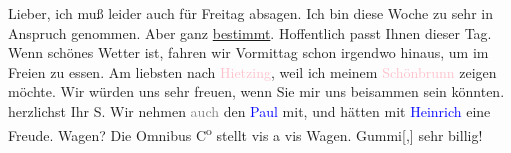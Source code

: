 \pstart
           {\pb}Lieber, ich muß leider auch für Freitag absagen. Ich bin diese Woche zu sehr in Anspruch genommen. Aber
                  \label{K_L03358-1v}\label{K_L03358-1h} ganz \uline{bestimmt}. Hoffentlich passt Ihnen dieser
               Tag. Wenn \label{K_L03358-2v}\label{K_L03358-2h} schönes Wetter ist, fahren wir Vormittag schon irgendwo hinaus,
               um im Freien zu essen. Am liebsten nach \textcolor{pink}{Hietzing}{}\ledrightnote{\textcolor{pink}{XIII., Hietzing}},
               weil ich meinem \label{K_L03358-3v}\label{K_L03358-3h}{ }\textcolor{pink}{Schönbrunn}{}\ledrightnote{\textcolor{pink}{Schlosspark Schönbrunn}} zeigen möchte. Wir würden uns sehr
               freuen, wenn Sie mir uns beisammen sein könnten.\pend
           \pstart herzlichst Ihr \spacefill\mbox{S.}\pend{}
\pstart
           \noindent{}Wir nehmen \textcolor{gray}{auch} den \textcolor{blue}{Paul}{}\ledrightnote{\textcolor{blue}{Paul Salten}}
                  mit, und hätten mit \textcolor{blue}{Heinrich}{}\ledrightnote{\textcolor{blue}{Heinrich Schnitzler}} eine Freude.
                  Wagen? Die Omnibus C\textsuperscript{o} stellt vis a vis Wagen.
                     Gummi{[},{]} sehr billig!\pend
           \endnumbering{}  
      